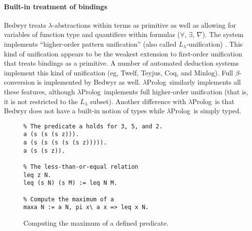 \documentclass{article}
\newcommand{\lp}{$\lambda$Prolog}
\begin{document}
\paragraph{Built-in treatment of bindings}
Bedwyr treats $\lambda$-abstractions within terms as primitive as well
as allowing for variables of function type and quantifiers within
formulas ($\forall$, $\exists$, $\nabla$).  The system
implements ``higher-order pattern unification'' (also called
$L_\lambda$-unification) \cite{miller91jlc}.   This kind of unification
appears to be the weakest extension to first-order unification that
treats bindings as a primitive.  A number of automated deduction systems
implement this kind of unification (eg, Twelf, Teyjus, Coq, and
Minlog).  Full $\beta$-conversion is implemented by Bedwyr as well.
\lp\ similarly implements all these features, although \lp\ implements
full higher-order unification (that is, it is not restricted to the
$L_\lambda$ subset).  Another difference with \lp\ is that Bedwyr does
not have a built-in notion of types while \lp\ is simply typed.

\begin{figure}
\begin{verbatim}
% The predicate a holds for 3, 5, and 2.
a (s (s (s z))).
a (s (s (s (s (s z))))).
a (s (s z)).

% The less-than-or-equal relation
leq z N.
leq (s N) (s M) := leq N M.

% Compute the maximum of a
maxa N := a N, pi x\ a x => leq x N.
\end{verbatim}
\caption{Computing the maximum of a defined predicate.}
\label{maxa}
\end{figure}
\end{document}
